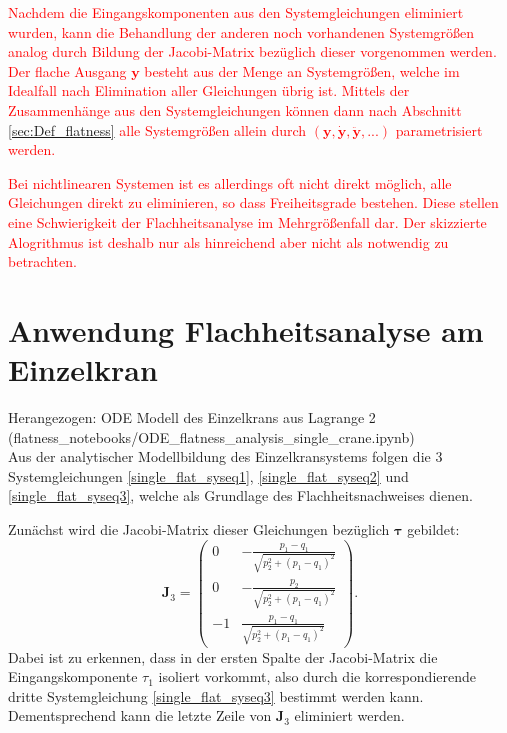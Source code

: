 \textcolor{red}{Nachdem die Eingangskomponenten aus den Systemgleichungen eliminiert wurden, kann die Behandlung der anderen noch vorhandenen Systemgrößen analog durch Bildung der Jacobi-Matrix bezüglich dieser vorgenommen werden. Der  flache Ausgang $\mathbf{y}$ besteht aus der Menge an Systemgrößen, welche im Idealfall nach Elimination aller Gleichungen übrig ist. Mittels der Zusammenhänge aus den Systemgleichungen können dann nach Abschnitt \ref{sec:Def_flatness} alle Systemgrößen allein durch $(\mathbf{y}, \dot{\mathbf{y}}, \ddot{\mathbf{y}}, ...)$ parametrisiert werden.}

\textcolor{red}{Bei nichtlinearen Systemen ist es allerdings oft nicht direkt möglich, alle Gleichungen direkt zu eliminieren, so dass Freiheitsgrade bestehen. Diese stellen eine Schwierigkeit der Flachheitsanalyse im Mehrgrößenfall dar. Der skizzierte Alogrithmus ist deshalb nur als hinreichend aber nicht als notwendig zu betrachten.}

\section{Anwendung Flachheitsanalyse am Einzelkran}
Herangezogen: ODE Modell des Einzelkrans aus Lagrange 2 \\ (flatness\_notebooks/ODE\_flatness\_analysis\_single\_crane.ipynb) \\
Aus der analytischer Modellbildung des Einzelkransystems folgen die 3 Systemgleichungen \ref{single_flat_syseq1}, \ref{single_flat_syseq2} und \ref{single_flat_syseq3}, welche als Grundlage des Flachheitsnachweises dienen. 

Zunächst wird die Jacobi-Matrix dieser Gleichungen bezüglich $\mathbf{\tau}$ gebildet:
\begin{equation}
	\mathbf{J}_3 =
	\left(\begin{matrix}
		0 & - \frac{p_{1} - q_{1}}{\sqrt{p_{2}^{2} + \left(p_{1} - q_{1}\right)^{2}}}\\
		0 & - \frac{p_{2}}{\sqrt{p_{2}^{2} + \left(p_{1} - q_{1}\right)^{2}}}\\
		-1 & \frac{p_{1} - q_{1}}{\sqrt{p_{2}^{2} + \left(p_{1} - q_{1}\right)^{2}}}
	\end{matrix}\right).
\end{equation}
Dabei ist zu erkennen, dass in der ersten Spalte der Jacobi-Matrix die Eingangskomponente $\tau_{1}$ isoliert vorkommt, also durch die korrespondierende dritte Systemgleichung \ref{single_flat_syseq3} bestimmt werden kann. Dementsprechend kann die letzte Zeile von $\mathbf{J}_3$ eliminiert werden.

